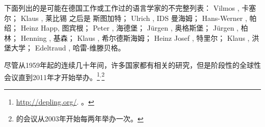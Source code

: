 下面列出的是可能在德国工作或工作过的语言学家的不完整列表：
Vilmos  \citet{Agel2000a-u}, 卡塞尔；
Klaus  \citet{Baumgaertner65a-u,Baumgaertner70a}, 莱比锡 之后是 斯图加特；
Ulrich  \citet{Engel77,Engel2014a}, IDS 曼海姆； 
Hans-Werner  \citet{Eroms85a,Eroms87b-u,Eroms2000a}, 帕绍； 
Heinz Happ, 图宾根；
Peter  \citet{Hellwig78a-u,Hellwig2003a}, 海德堡；
Jürgen  \citet{Heringer96a-u}, 奥格斯堡； 
Jürgen  \citet{Kunze68a-u,Kunze75a-u}, 柏林；
Henning  \citet{Lobin93a-u}, 基森；
Klaus  \citet{Schubert87a-u}, 希尔德斯海姆；
Heinz Josef  \citet{Weber97a}, 特里尔；
Klaus  \citet{Welke88a-u,Welke2011a-u}, 洪堡大学；
Edeltraud  \citet{Werner93a-u}, 哈雷-维滕贝格。

尽管从1959年起的连续几十年间，许多国家都有相关的研究，但是阶段性的全球性会议直到2011年才开始举办。\footnote{%
  \href{http://depling.org/}{http://depling.org/}. 。
}$^,$\footnote{%
  \mtt 的会议从2003年开始每两年举办一次。
}

